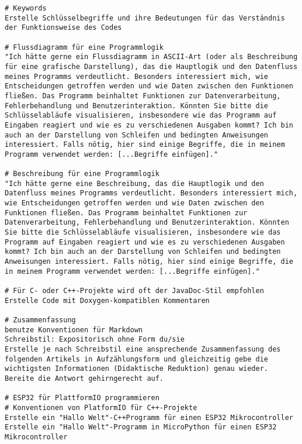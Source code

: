 \documentclass{vorlage-design-main}
\begin{document}
\begin{lstlisting}
# Keywords
Erstelle Schlüsselbegriffe und ihre Bedeutungen für das Verständnis der Funktionsweise des Codes

# Flussdiagramm für eine Programmlogik
"Ich hätte gerne ein Flussdiagramm in ASCII-Art (oder als Beschreibung für eine grafische Darstellung), das die Hauptlogik und den Datenfluss meines Programms verdeutlicht. Besonders interessiert mich, wie Entscheidungen getroffen werden und wie Daten zwischen den Funktionen fließen. Das Programm beinhaltet Funktionen zur Datenverarbeitung, Fehlerbehandlung und Benutzerinteraktion. Könnten Sie bitte die Schlüsselabläufe visualisieren, insbesondere wie das Programm auf Eingaben reagiert und wie es zu verschiedenen Ausgaben kommt? Ich bin auch an der Darstellung von Schleifen und bedingten Anweisungen interessiert. Falls nötig, hier sind einige Begriffe, die in meinem Programm verwendet werden: [...Begriffe einfügen]."

# Beschreibung für eine Programmlogik
"Ich hätte gerne eine Beschreibung, das die Hauptlogik und den Datenfluss meines Programms verdeutlicht. Besonders interessiert mich, wie Entscheidungen getroffen werden und wie Daten zwischen den Funktionen fließen. Das Programm beinhaltet Funktionen zur Datenverarbeitung, Fehlerbehandlung und Benutzerinteraktion. Könnten Sie bitte die Schlüsselabläufe visualisieren, insbesondere wie das Programm auf Eingaben reagiert und wie es zu verschiedenen Ausgaben kommt? Ich bin auch an der Darstellung von Schleifen und bedingten Anweisungen interessiert. Falls nötig, hier sind einige Begriffe, die in meinem Programm verwendet werden: [...Begriffe einfügen]."

# Für C- oder C++-Projekte wird oft der JavaDoc-Stil empfohlen
Erstelle Code mit Doxygen-kompatiblen Kommentaren

# Zusammenfassung
benutze Konventionen für Markdown
Schreibstil: Expositorisch ohne Form du/sie
Erstelle je nach Schreibstil eine ansprechende Zusammenfassung des folgenden Artikels in Aufzählungsform und gleichzeitig gebe die wichtigsten Informationen (Didaktische Reduktion) genau wieder. Bereite die Antwort gehirngerecht auf.

# ESP32 für PlattformIO programmieren
# Konventionen von PlatformIO für C++-Projekte
Erstelle ein "Hallo Welt"-C++Programm für einen ESP32 Mikrocontroller 
Erstelle ein "Hallo Welt"-Programm in MicroPython für einen ESP32 Mikrocontroller 
\end{lstlisting}
\end{document}
